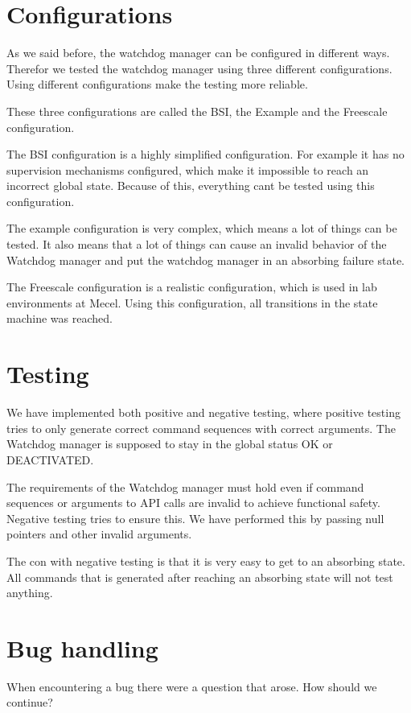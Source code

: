 \documentclass[a4paper]{article}
\begin{document}
\section{Configurations}
As we said before, the watchdog manager can be configured in different
ways. Therefor we tested the watchdog manager using three different
configurations. Using different configurations make the testing more
reliable.

These three configurations are called the BSI, the Example and the
Freescale configuration.

The BSI configuration is a highly simplified configuration. For
example it has no supervision mechanisms configured, which make it
impossible to reach an incorrect global state.
Because of this, everything cant be tested using this configuration.

The example configuration is very complex, which means a lot of things
can be tested. It also means that a lot of things can cause an invalid
behavior of the Watchdog manager and put the watchdog manager in an
absorbing failure state.

The Freescale configuration is a realistic configuration, which is
used in lab environments at Mecel. Using this configuration, all
transitions in the state machine was reached.

\section{Testing}
We have implemented both positive and negative testing, where positive
testing tries to only generate correct command sequences with correct
arguments. The Watchdog manager is supposed to stay in the global
status OK or DEACTIVATED.

The requirements of the Watchdog manager must hold even if command
sequences or arguments to API calls are invalid to achieve functional
safety. Negative testing tries to ensure this. We have performed this
by passing null pointers and other invalid arguments.

The con with negative testing is that it is very easy to get to an
absorbing state. All commands that is generated after reaching an
absorbing state will not test anything.

\section{Bug handling}
When encountering a bug there were a question that arose. How should
we continue?
\end{document}

